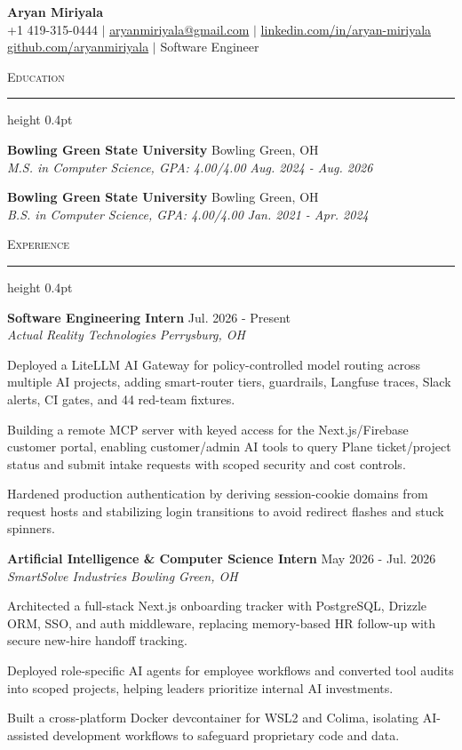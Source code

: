 \documentclass[letterpaper,11pt]{article}
\newcommand{\resumesection}[1]{%
  \par\vspace{2pt}%
  {\large\scshape #1}\par\vspace{2pt}%
  \hrule height 0.4pt\vspace{2pt}%
}
\newcommand{\resumeSubheading}[4]{
  \textbf{#1} \hfill #2\\
  \textit{#3} \hfill \textit{#4}
}
\begin{document}
\begin{center}
  {\LARGE \textbf{Aryan Miriyala}}\\[2pt]
  \small
  +1 419-315-0444 $|$ \href{mailto:aryanmiriyala@gmail.com}{aryanmiriyala@gmail.com} $|$ \href{https://www.linkedin.com/in/aryan-miriyala-7788a21b6/}{linkedin.com/in/aryan-miriyala}\\
  \href{https://github.com/aryanmiriyala}{github.com/aryanmiriyala} $|$ Software Engineer
\end{center}\vspace{-6pt}

\resumesection{Education}
\resumeSubheading
{Bowling Green State University}{Bowling Green, OH}
{M.S. in Computer Science, GPA: 4.00/4.00}{Aug. 2024 - Aug. 2026}

\resumeSubheading
{Bowling Green State University}{Bowling Green, OH}
{B.S. in Computer Science, GPA: 4.00/4.00}{Jan. 2021 - Apr. 2024}

\resumesection{Experience}
\resumeSubheading
{Software Engineering Intern}{Jul. 2026 - Present}
{Actual Reality Technologies}{Perrysburg, OH}
\begin{tightitemize}
  \item Deployed a LiteLLM AI Gateway for policy-controlled model routing across multiple AI projects, adding smart-router tiers, guardrails, Langfuse traces, Slack alerts, CI gates, and 44 red-team fixtures.
  \item Building a remote MCP server with keyed access for the Next.js/Firebase customer portal, enabling customer/admin AI tools to query Plane ticket/project status and submit intake requests with scoped security and cost controls.
  \item Hardened production authentication by deriving session-cookie domains from request hosts and stabilizing login transitions to avoid redirect flashes and stuck spinners.
\end{tightitemize}

\resumeSubheading
{Artificial Intelligence \& Computer Science Intern}{May 2026 - Jul. 2026}
{SmartSolve Industries}{Bowling Green, OH}
\begin{tightitemize}
  \item Architected a full-stack Next.js onboarding tracker with PostgreSQL, Drizzle ORM, SSO, and auth middleware, replacing memory-based HR follow-up with secure new-hire handoff tracking.
  \item Deployed role-specific AI agents for employee workflows and converted tool audits into scoped projects, helping leaders prioritize internal AI investments.
  \item Built a cross-platform Docker devcontainer for WSL2 and Colima, isolating AI-assisted development workflows to safeguard proprietary code and data.
\end{tightitemize}
\end{document}
